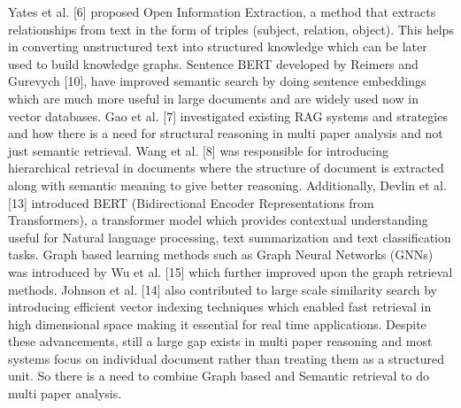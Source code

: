 \documentclass[10pt]{article}
\begin{document}
Yates et al. [6] proposed Open Information Extraction, a method that extracts relationships from text in the form of triples (subject, relation, object). This helps in converting unstructured text into structured knowledge which can be later used to build knowledge graphs. Sentence BERT developed by Reimers and Gurevych [10], have improved semantic search by doing sentence embeddings which are much more useful in large documents and are widely used now in vector databases. Gao et al. [7] investigated existing RAG systems and strategies and how there is a need for structural reasoning in multi paper analysis and not just semantic retrieval. Wang et al. [8] was responsible for introducing hierarchical retrieval in documents where the structure of document is extracted along with semantic meaning to give better reasoning. Additionally, Devlin et al. [13] introduced BERT (Bidirectional Encoder Representations from Transformers), a transformer model which provides contextual understanding useful for Natural language processing, text summarization and text classification tasks. Graph based learning methods such as Graph Neural Networks (GNNs) was introduced by Wu et al. [15] which further improved upon the graph retrieval methods. Johnson et al. [14] also contributed to large scale similarity search by introducing efficient vector indexing techniques which enabled fast retrieval in high dimensional space making it essential for real time applications. Despite these advancements, still a large gap exists in multi paper reasoning and most systems focus on individual document rather than treating them as a structured unit. So there is a need to combine Graph based and Semantic retrieval to do multi paper analysis.
\end{document}
